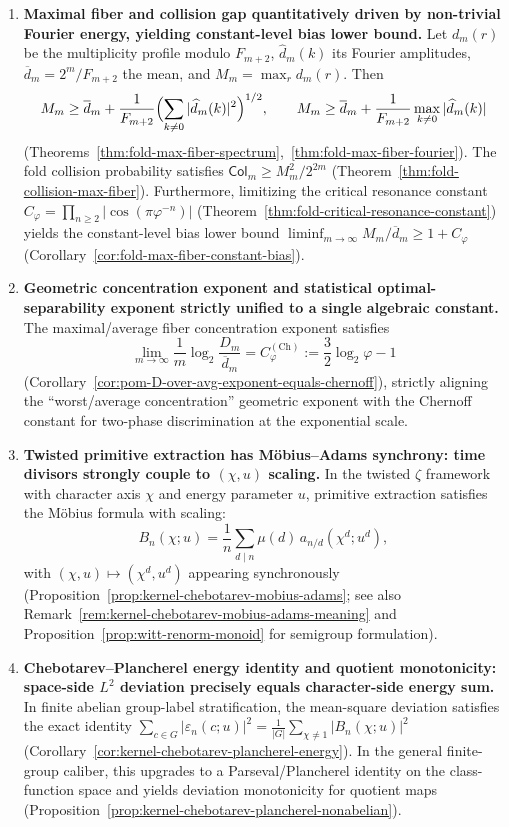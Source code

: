 \begin{enumerate}
  \item \textbf{Maximal fiber and collision gap quantitatively driven by non-trivial Fourier energy, yielding constant-level bias lower bound.}
  Let \(d_m(r)\) be the multiplicity profile modulo \(F_{m+2}\), \(\widehat d_m(k)\) its Fourier amplitudes, \(\overline d_m=2^m/F_{m+2}\) the mean, and \(M_m=\max_r d_m(r)\).
  Then
  \[
  M_m\ge \overline d_m+\frac{1}{F_{m+2}}\Bigl(\sum_{k\ne 0}|\widehat d_m(k)|^2\Bigr)^{1/2},
  \qquad
  M_m\ge \overline d_m+\frac{1}{F_{m+2}}\max_{k\ne 0}|\widehat d_m(k)|
  \]
  (Theorems~\ref{thm:fold-max-fiber-spectrum},~\ref{thm:fold-max-fiber-fourier}).
  The fold collision probability satisfies
  \(
  \mathsf{Col}_m\ge M_m^2/2^{2m}
  \)
  (Theorem~\ref{thm:fold-collision-max-fiber}).
  Furthermore, limitizing the critical resonance constant \(C_\varphi=\prod_{n\ge 2}|\cos(\pi\varphi^{-n})|\) (Theorem~\ref{thm:fold-critical-resonance-constant}) yields the constant-level bias lower bound
  \(\liminf_{m\to\infty}M_m/\overline d_m\ge 1+C_\varphi\) (Corollary~\ref{cor:fold-max-fiber-constant-bias}).

  \item \textbf{Geometric concentration exponent and statistical optimal-separability exponent strictly unified to a single algebraic constant.}
  The maximal/average fiber concentration exponent satisfies
  \[
  \boxed{\ \lim_{m\to\infty}\frac{1}{m}\log_2\frac{D_m}{\overline d_m}=C_\varphi^{(\mathrm{Ch})}:=\frac32\log_2\varphi-1\ }
  \]
  (Corollary~\ref{cor:pom-D-over-avg-exponent-equals-chernoff}), strictly aligning the ``worst/average concentration'' geometric exponent with the Chernoff constant for two-phase discrimination at the exponential scale.

  \item \textbf{Twisted primitive extraction has Möbius--Adams synchrony: time divisors strongly couple to \texorpdfstring{$(\chi,u)$}{(chi,u)} scaling.}
  In the twisted \(\zeta\) framework with character axis \(\chi\) and energy parameter \(u\), primitive extraction satisfies the Möbius formula with scaling:
  \[
  B_n(\chi;u)=\frac{1}{n}\sum_{d\mid n}\mu(d)\,a_{n/d}(\chi^d;u^d),
  \]
  with \((\chi,u)\mapsto(\chi^d,u^d)\) appearing synchronously (Proposition~\ref{prop:kernel-chebotarev-mobius-adams}; see also Remark~\ref{rem:kernel-chebotarev-mobius-adams-meaning} and Proposition~\ref{prop:witt-renorm-monoid} for semigroup formulation).

  \item \textbf{Chebotarev--Plancherel energy identity and quotient monotonicity: space-side \texorpdfstring{$L^2$}{L2} deviation precisely equals character-side energy sum.}
  In finite abelian group-label stratification, the mean-square deviation satisfies the exact identity
  \(
  \sum_{c\in G}|\varepsilon_n(c;u)|^2=\frac{1}{|G|}\sum_{\chi\ne 1}|B_n(\chi;u)|^2
  \)
  (Corollary~\ref{cor:kernel-chebotarev-plancherel-energy}).
  In the general finite-group caliber, this upgrades to a Parseval/Plancherel identity on the class-function space and yields deviation monotonicity for quotient maps (Proposition~\ref{prop:kernel-chebotarev-plancherel-nonabelian}).


\end{enumerate}
